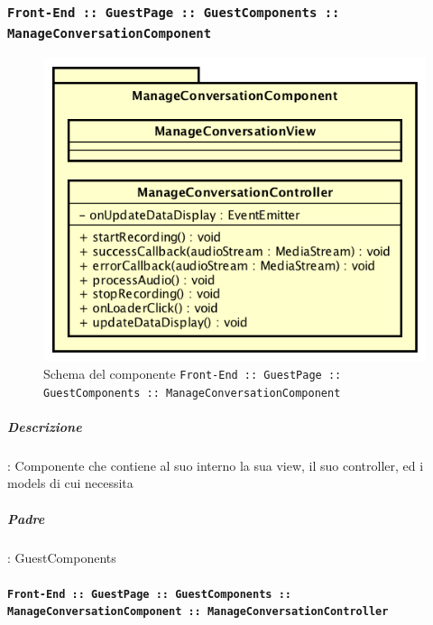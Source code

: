 \documentclass[../DefinizioneDiProdotto_v3.0.0.tex]{subfiles}
\begin{document}
	\newpage
	\subsubsection{\texttt{Front-End :: GuestPage :: GuestComponents :: ManageConversationComponent}}
	\begin{figure}[!h]
		\centering
		\includegraphics[scale=0.7]{Architettura/Front-End/GuestPage/GuestComponents/ManageConversationComponent.png}
		\caption{Schema del componente \texttt{Front-End :: GuestPage :: GuestComponents :: ManageConversationComponent}}
	\end{figure}

			\subparagraph{Descrizione}: Componente che contiene al suo interno la sua view, il suo controller, ed i models di cui necessita
			\subparagraph{Padre}: GuestComponents

			\paragraph{\texttt{Front-End :: GuestPage :: GuestComponents :: ManageConversationComponent :: ManageConversationController}}
\end{document}
